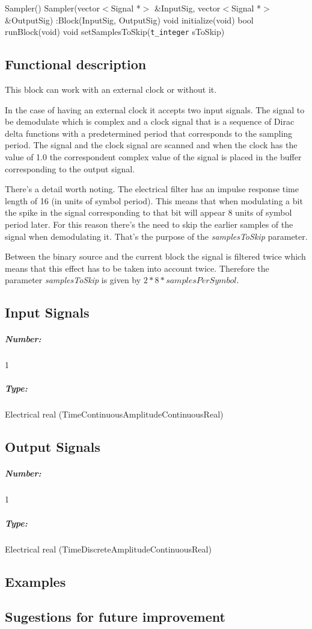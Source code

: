 Sampler() {}
\bigbreak
Sampler(vector$<$Signal *$>$ \&InputSig, vector$<$Signal *$>$ \&OutputSig) :Block(InputSig, OutputSig) {}
\bigbreak
void initialize(void)
\bigbreak
bool runBlock(void)
\bigbreak
void setSamplesToSkip(\texttt{t\_integer} sToSkip)

\subsection*{Functional description}

This block can work with an external clock or without it. 

In the case of having an external clock it accepts two input signals. The signal to be demodulate which is complex and a clock signal that is a sequence of Dirac delta functions with a predetermined period that corresponds to the sampling period. The signal and the clock signal are scanned and when the clock has the value of 1.0 the correspondent complex value of the signal is placed in the buffer corresponding to the output signal.

There's a detail worth noting. The electrical filter has an impulse response time length of 16 (in units of symbol period). This means that when modulating a bit the spike in the signal corresponding to that bit will appear 8 units of symbol period later. For this reason there's the need to skip the earlier samples of the signal when demodulating it. That's the purpose of the \textit{samplesToSkip} parameter.

Between the binary source and the current block the signal is filtered twice which means that this effect has to be taken into account twice. Therefore the parameter \textit{samplesToSkip} is given by $2*8*samplesPerSymbol$. 

\pagebreak

\subsection*{Input Signals}

\subparagraph*{Number:} 1

\subparagraph*{Type:} Electrical real (TimeContinuousAmplitudeContinuousReal)

\subsection*{Output Signals}

\subparagraph*{Number:} 1

\subparagraph*{Type:} Electrical real (TimeDiscreteAmplitudeContinuousReal)

\subsection*{Examples} 


\subsection*{Sugestions for future improvement}
